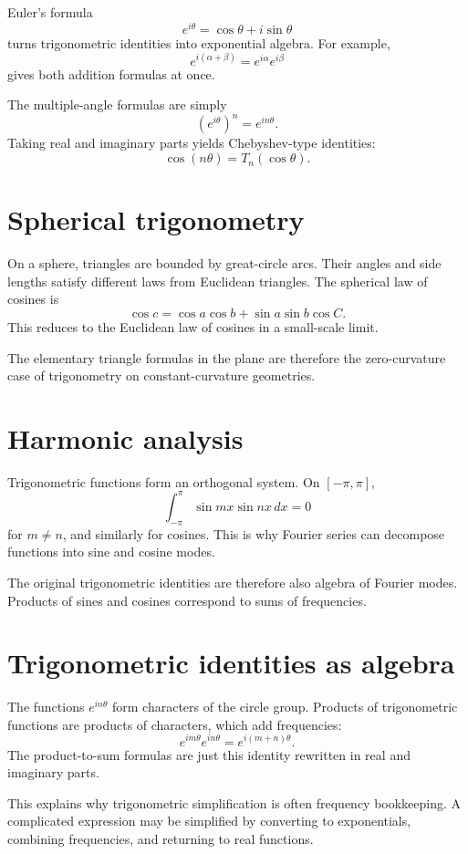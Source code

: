 Euler's formula
\[
  e^{i\theta}=\cos\theta+i\sin\theta
\]
turns trigonometric identities into exponential algebra.  For example,
\[
  e^{i(\alpha+\beta)}=e^{i\alpha}e^{i\beta}
\]
gives both addition formulas at once.

The multiple-angle formulas are simply
\[
  (e^{i\theta})^n=e^{in\theta}.
\]
Taking real and imaginary parts yields Chebyshev-type identities:
\[
  \cos(n\theta)=T_n(\cos\theta).
\]

\section{Spherical trigonometry}

On a sphere, triangles are bounded by great-circle arcs.  Their angles and side lengths satisfy different laws from Euclidean triangles.  The spherical law of cosines is
\[
  \cos c=\cos a\cos b+\sin a\sin b\cos C.
\]
This reduces to the Euclidean law of cosines in a small-scale limit.

The elementary triangle formulas in the plane are therefore the zero-curvature case of trigonometry on constant-curvature geometries.

\section{Harmonic analysis}

Trigonometric functions form an orthogonal system.  On $[-\pi,\pi]$,
\[
  \int_{-\pi}^{\pi}\sin mx\sin nx\,dx=0
\]
for $m\ne n$, and similarly for cosines.  This is why Fourier series can decompose functions into sine and cosine modes.

The original trigonometric identities are therefore also algebra of Fourier modes.  Products of sines and cosines correspond to sums of frequencies.

\section{Trigonometric identities as algebra}

The functions $e^{in\theta}$ form characters of the circle group.  Products of trigonometric functions are products of characters, which add frequencies:
\[
  e^{im\theta}e^{in\theta}=e^{i(m+n)\theta}.
\]
The product-to-sum formulas are just this identity rewritten in real and imaginary parts.

This explains why trigonometric simplification is often frequency bookkeeping.  A complicated expression may be simplified by converting to exponentials, combining frequencies, and returning to real functions.

